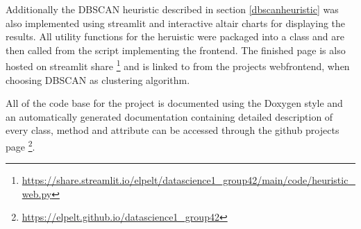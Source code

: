 Additionally the DBSCAN heuristic described in section \ref{dbscanheuristic} was also implemented using streamlit and interactive altair charts for displaying the results. All utility functions for the heruistic were packaged into a class and are then called from the script implementing the frontend. The finished page is also hosted on streamlit share \footnote{\url{https://share.streamlit.io/elpelt/datascience1_group42/main/code/heuristic_web.py}} and is linked to from the projects webfrontend, when choosing DBSCAN as clustering algorithm.

All of the code base for the project is documented using the Doxygen style and an automatically generated documentation containing detailed description of every class, method and attribute can be accessed through the github projects page \footnote{\url{https://elpelt.github.io/datascience1_group42}}.